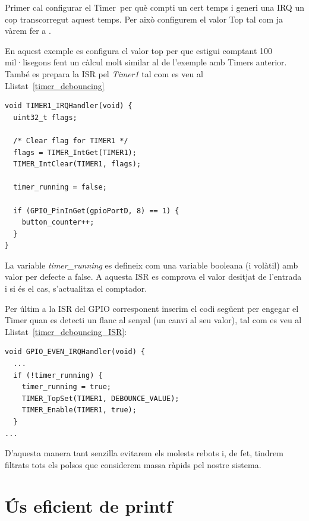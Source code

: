 Primer cal configurar el Timer per què compti un cert temps i generi una IRQ un cop transcorregut aquest temps. Per això configurem el valor Top tal com ja vàrem fer a .

En aquest exemple es configura el valor top per que estigui comptant 100 mil·lisegons fent un càlcul molt similar al de l'exemple amb Timers anterior. També es prepara la \gls{ISR} pel {\em Timer1} tal com es veu al Llistat~\ref{timer_debouncing}

\begin{lstlisting}[style=customc, caption=ISR del timer per fer debouncing, label=timer_debouncing]
void TIMER1_IRQHandler(void) {
  uint32_t flags;

  /* Clear flag for TIMER1 */
  flags = TIMER_IntGet(TIMER1);
  TIMER_IntClear(TIMER1, flags);

  timer_running = false;

  if (GPIO_PinInGet(gpioPortD, 8) == 1) {
    button_counter++;
  }
} 
\end{lstlisting}

La variable {\em timer\_running} es defineix com una variable booleana (i volàtil) amb valor per defecte a false. A aquesta ISR es comprova el valor desitjat de l'entrada i si és el cas, s'actualitza el comptador.

Per últim a la ISR del GPIO corresponent inserim el codi següent per engegar el Timer quan es detecti un flanc al senyal (un canvi al seu valor), tal com es veu al Llistat~\ref{timer_debouncing_ISR}:

\begin{lstlisting}[style=customc, caption=Codi per engegar el timer a la ISR del GPIO, label=timer_debouncing_ISR]
void GPIO_EVEN_IRQHandler(void) {
  ...
  if (!timer_running) {
    timer_running = true;
    TIMER_TopSet(TIMER1, DEBOUNCE_VALUE);
    TIMER_Enable(TIMER1, true);
  }
...
\end{lstlisting}

D'aquesta manera tant senzilla evitarem els molests rebots i, de fet, tindrem filtrats tots els polsos que considerem massa ràpids pel nostre sistema.

\section{Ús eficient de printf}

